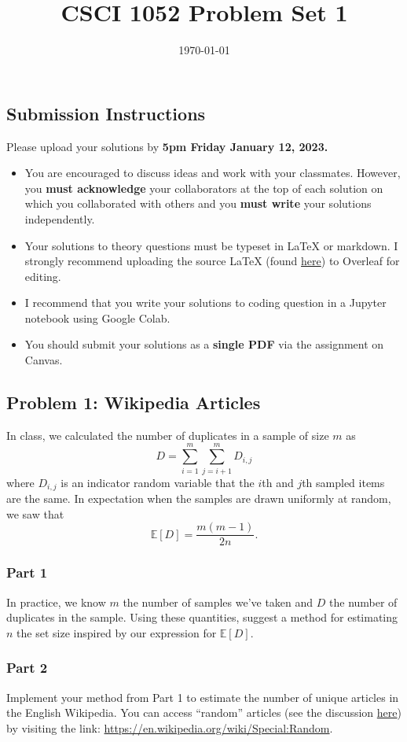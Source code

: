 \documentclass{article}
\title{CSCI 1052 Problem Set 1}
\author{} %
\date{\today}
\begin{document}
\maketitle

\subsection*{Submission Instructions}

Please upload your solutions by
\textbf{5pm Friday January 12, 2023.}
\begin{itemize}
\item You are encouraged to discuss ideas
and work with your classmates. However, you
\textbf{must acknowledge} your collaborators
at the top of each solution on which
you collaborated with others 
and you \textbf{must write} your solutions
independently.
\item Your solutions to theory questions must
be typeset in LaTeX or markdown.
I strongly recommend uploading the source LaTeX (found 
\href{https://www.rtealwitter.com/rads2024/files/ps1.tex}{here})
to Overleaf for editing.
\item I recommend that you write your solutions to coding question in a Jupyter notebook using Google Colab.
\item You should submit your solutions as a \textbf{single PDF} via the assignment on Canvas.
\end{itemize}

\subsection*{Problem 1: Wikipedia Articles}
In class, we calculated the number of duplicates in a sample of size $m$ as
$$
D = \sum_{i=1}^m \sum_{j=i+1}^m D_{i,j}
$$
where $D_{i,j}$ is an indicator random variable that the $i$th and $j$th sampled items are the same.
In expectation when the samples are drawn uniformly at random, we saw that
$$
\mathbb{E}[D] = \frac{m (m-1)}{2 n}.
$$

\subsubsection*{Part 1} 
In practice, we know $m$ the number of samples we've taken and $D$ the number of duplicates in the sample.
Using these quantities, suggest a method for estimating $n$ the set size inspired by our expression for $\mathbb{E}[D]$.

\subsubsection*{Part 2}
Implement your method from Part 1 to estimate the number of unique articles in the English Wikipedia.
You can access ``random'' articles (see the discussion \href{https://en.wikipedia.org/wiki/Wikipedia:FAQ/Technical#random}{here}) by visiting the link: \url{https://en.wikipedia.org/wiki/Special:Random}.
\end{document}
